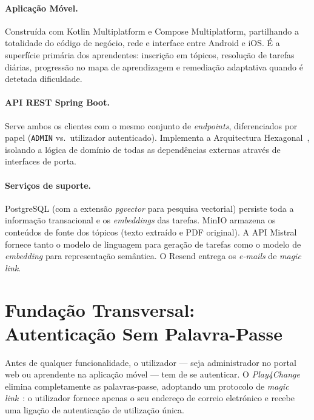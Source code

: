 \paragraph{Aplicação Móvel.}
Construída com Kotlin Multiplatform e Compose Multiplatform, partilhando
a totalidade do código de negócio, rede e interface entre Android e iOS.
É a superfície primária dos aprendentes: inscrição em tópicos, resolução
de tarefas diárias, progressão no mapa de aprendizagem e remediação
adaptativa quando é detetada dificuldade.

\paragraph{API REST Spring Boot.}
Serve ambos os clientes com o mesmo conjunto de \textit{endpoints},
diferenciados por papel (\texttt{ADMIN} vs.\ utilizador autenticado).
Implementa a Arquitectura Hexagonal~\cite{cockburn2005hexagonal}, isolando
a lógica de domínio de todas as dependências externas através de
interfaces de porta.

\paragraph{Serviços de suporte.}
PostgreSQL (com a extensão \textit{pgvector} para pesquisa vectorial)
persiste toda a informação transacional e os \textit{embeddings} das
tarefas.
MinIO armazena os conteúdos de fonte dos tópicos (texto extraído e PDF
original).
A API Mistral fornece tanto o modelo de linguagem para geração de tarefas
como o modelo de \textit{embedding} para representação semântica.
O Resend entrega os \textit{e-mails} de \textit{magic link}.

\section{Fundação Transversal: Autenticação Sem Palavra-Passe}
\label{sec:autenticacao}

Antes de qualquer funcionalidade, o utilizador — seja administrador no
portal web ou aprendente na aplicação móvel — tem de se autenticar.
O \textit{Play4Change} elimina completamente as palavras-passe, adoptando
um protocolo de \textit{magic link}~\cite{owasp2021a07}: o utilizador
fornece apenas o seu endereço de correio eletrónico e recebe uma ligação
de autenticação de utilização única.


